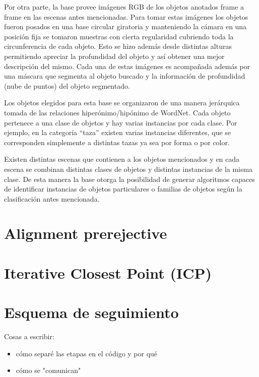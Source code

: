Por otra parte, la base provee imágenes RGB de los objetos anotados frame a frame en las escenas antes mencionadas. Para tomar estas imágenes los objetos fueron posados en una base circular giratoria y manteniendo la cámara en una posición fija se tomaron muestras con cierta regularidad cubriendo toda la circunferencia de cada objeto. Esto se hizo además desde distintas alturas permitiendo apreciar la profundidad del objeto y así obtener una mejor descripción del mismo. Cada una de estas imágenes es acompañada además por una máscara que segmenta al objeto buscado y la información de profundidad (nube de puntos) del objeto segmentado.

Los objetos elegidos para esta base se organizaron de una manera jerárquica tomada de las relaciones hiperónimo/hipónimo de WordNet. Cada objeto pertenece a una clase de objetos y hay varias instancias por cada clase. Por ejemplo, en la categoría ``taza'' existen varias instancias diferentes, que se corresponden simplemente a distintas tazas ya sea por forma o por color.

Existen distintas escenas que contienen a los objetos mencionados y en cada escena se combinan distintas clases de objetos y distintas instancias de la misma clase. De esta manera la base otorga la posibilidad de generar algoritmos capaces de identificar instancias de objetos particulares o familias de objetos según la clasificación antes mencionada.


\section{Alignment prerejective}\label{alignment_prerejective}

\section{Iterative Closest Point (ICP)}

\section{Esquema de seguimiento}
Cosas a escribir:
\begin{itemize}
	\item cómo separé las etapas en el código y por qué
	\item cómo se "comunican"
\end{itemize}


